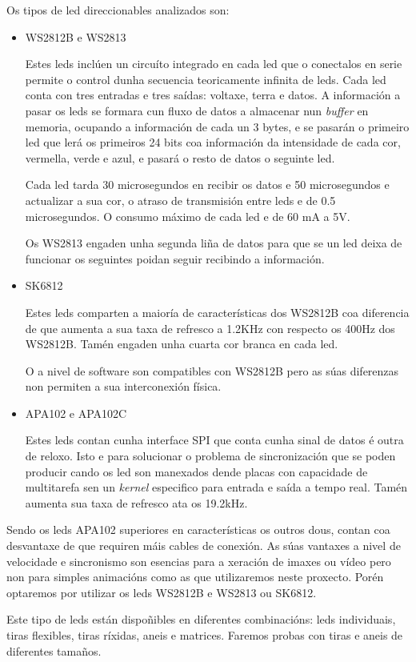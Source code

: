Os tipos de led direccionables analizados son:
\begin{itemize}
    \item WS2812B e WS2813

Estes leds inclúen un circuíto integrado en cada led que o conectalos en serie permite o control dunha secuencia teoricamente infinita de leds. Cada led conta con tres entradas e tres saídas: voltaxe, terra e datos. A información a pasar os leds se formara cun fluxo de datos a almacenar nun \emph{buffer} en memoria, ocupando a información de cada un 3 bytes, e se pasarán o primeiro led que lerá os primeiros 24 bits coa información da intensidade de cada cor, vermella, verde e azul, e pasará o resto de datos o seguinte led.

Cada led tarda 30 microsegundos en recibir os datos e 50 microsegundos e actualizar a sua cor, o atraso de transmisión entre leds e de 0.5 microsegundos. O consumo máximo de cada led e de 60 mA a 5V.

Os WS2813 engaden unha segunda liña de datos para que se un led deixa de funcionar os seguintes poidan seguir recibindo a información.
    \item SK6812

Estes leds comparten a maioría de características dos WS2812B coa diferencia de que aumenta a sua taxa de refresco a 1.2KHz con respecto os 400Hz dos WS2812B. Tamén engaden unha cuarta cor branca en cada led.

O a nivel de software son compatibles con WS2812B pero as súas diferenzas non permiten a sua interconexión física.
    \item APA102 e APA102C

Estes leds contan cunha interface SPI que conta cunha sinal de datos é outra de reloxo. Isto e para solucionar o problema de sincronización que se poden producir cando os led son manexados dende placas con capacidade de multitarefa sen un \emph{kernel} especifico para entrada e saída a tempo real. Tamén aumenta sua taxa de refresco ata os 19.2kHz.
\end{itemize}

Sendo os leds APA102 superiores en características os outros dous, contan coa desvantaxe de que requiren máis cables de conexión. As súas vantaxes a nivel de velocidade e sincronismo son esencias para a xeración de imaxes ou vídeo pero non para simples animacións como as que utilizaremos neste proxecto. Porén optaremos por utilizar os leds WS2812B e WS2813 ou SK6812.

Este tipo de leds están dispoñibles en diferentes combinacións: leds individuais, tiras flexibles, tiras ríxidas, aneis e matrices. Faremos probas con tiras e aneis de diferentes tamaños.


